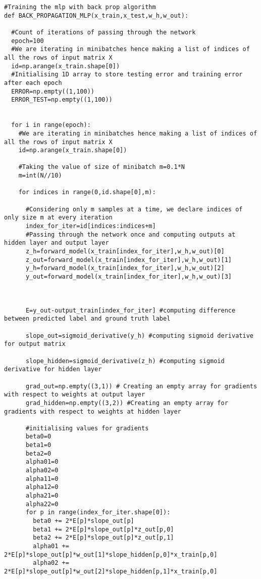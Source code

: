 \documentclass[12pt,letterpaper, onecolumn]{exam}
\begin{document}
\begin{lstlisting}
#Training the mlp with back prop algorithm  
def BACK_PROPAGATION_MLP(x_train,x_test,w_h,w_out):
 
  #Count of iterations of passing through the network
  epoch=100
  #We are iterating in minibatches hence making a list of indices of all the rows of input matrix X
  id=np.arange(x_train.shape[0])
  #Initialising 1D array to store testing error and training error after each epoch
  ERROR=np.empty((1,100))
  ERROR_TEST=np.empty((1,100))

  
  for i in range(epoch):
    #We are iterating in minibatches hence making a list of indices of all the rows of input matrix X
    id=np.arange(x_train.shape[0])
    
    #Taking the value of size of minibatch m=0.1*N
    m=int(N//10)
    
    for indices in range(0,id.shape[0],m):
      
      #Considering only m samples at a time, we declare indices of only size m at every iteration 
      index_for_iter=id[indices:indices+m]
      #Passing through the network once and computing outputs at hidden layer and output layer 
      z_h=forward_model(x_train[index_for_iter],w_h,w_out)[0]
      z_out=forward_model(x_train[index_for_iter],w_h,w_out)[1]
      y_h=forward_model(x_train[index_for_iter],w_h,w_out)[2]
      y_out=forward_model(x_train[index_for_iter],w_h,w_out)[3]

      
      
      E=y_out-output_train[index_for_iter] #computing difference between predicted label and ground truth label
      
      slope_out=sigmoid_derivative(y_h) #computing sigmoid derivative for output matrix

      slope_hidden=sigmoid_derivative(z_h) #computing sigmoid derivative for hidden layer 
      
      grad_out=np.empty((3,1)) # Creating an empty array for gradients with respect to weights at output layer
      grad_hidden=np.empty((3,2)) #Creating an empty array for gradients with respect to weights at hidden layer

      #initialising values for gradients
      beta0=0
      beta1=0
      beta2=0
      alpha01=0
      alpha02=0
      alpha11=0
      alpha12=0
      alpha21=0
      alpha22=0
      for p in range(index_for_iter.shape[0]):
        beta0 += 2*E[p]*slope_out[p]
        beta1 += 2*E[p]*slope_out[p]*z_out[p,0]
        beta2 += 2*E[p]*slope_out[p]*z_out[p,1]
        alpha01 += 2*E[p]*slope_out[p]*w_out[1]*slope_hidden[p,0]*x_train[p,0]
        alpha02 += 2*E[p]*slope_out[p]*w_out[2]*slope_hidden[p,1]*x_train[p,0]


\end{lstlisting}
\end{document}

